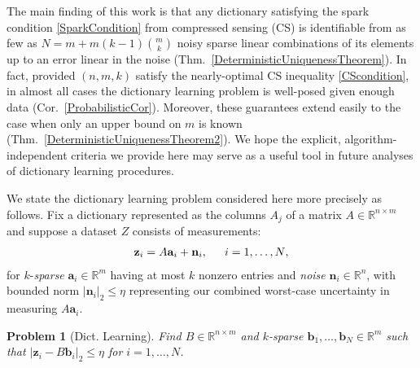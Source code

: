 \documentclass[journal, twocolumn]{IEEEtran}
\newtheorem{problem}{Problem}
\begin{document}
The main finding of this work is that any dictionary satisfying the spark condition \eqref{SparkCondition} from compressed sensing (CS) is identifiable from as few as $N = m + m(k-1){m \choose k}$ noisy sparse linear combinations of its elements up to an error linear in the noise (Thm.~\ref{DeterministicUniquenessTheorem}). In fact, provided $(n, m, k)$ satisfy the nearly-optimal CS inequality \eqref{CScondition}, in almost all cases the dictionary learning problem is well-posed given enough data (Cor.~\ref{ProbabilisticCor}). Moreover, these guarantees extend easily to the case when only an upper bound on $m$ is known (Thm.~\ref{DeterministicUniquenessTheorem2}). We hope the explicit, algorithm-independent criteria we provide here may serve as a useful tool in future analyses of dictionary learning procedures.


We state the dictionary learning problem considered here more precisely as follows. Fix a dictionary represented as the columns $A_j$ of a matrix $A \in \mathbb R^{n \times m}$ and suppose a dataset $Z$ consists of measurements:
\begin{align}\label{LinearModel}
\mathbf{z}_i = A\mathbf{a}_i + \mathbf{n}_i,\indent \text{$i=1,\ldots,N$},
\end{align}
for $k$-\emph{sparse} $\mathbf{a}_i \in \mathbb{R}^m$ having at most $k$ nonzero entries and \emph{noise} $\mathbf{n}_i \in \mathbb{R}^n$, with bounded norm $| \mathbf{n}_i |_2 \leq  \eta$ representing our combined worst-case uncertainty in  measuring $A\mathbf{a}_i$.

\begin{problem}[Dict. Learning]\label{InverseProblem}
Find $B \in \mathbb{R}^{n \times m}$ and $k$-sparse $\mathbf{b}_1, \ldots, \mathbf{b}_N \in \mathbb{R}^m$ such that $|\mathbf{z}_i - B\mathbf{b}_i|_2 \leq \eta$ for $i = 1, \ldots, N$.
\end{problem}
\end{document}
